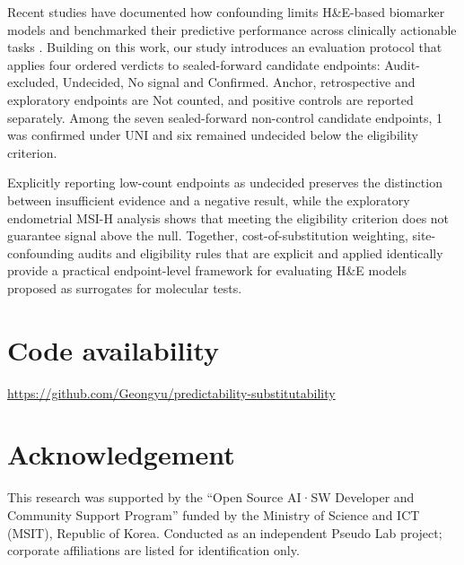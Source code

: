 \documentclass[a4paper,10pt,twocolumn]{extarticle}
\begin{document}
Recent studies have documented how confounding limits H\&E-based biomarker models \cite{dawood2026} and benchmarked their predictive performance across clinically actionable tasks \cite{goldmark2026}. Building on this work, our study introduces an evaluation protocol that applies four ordered verdicts to sealed-forward candidate endpoints: Audit-excluded, Undecided, No signal and Confirmed. Anchor, retrospective and exploratory endpoints are Not counted, and positive controls are reported separately. Among the seven sealed-forward non-control candidate endpoints, 1 was confirmed under UNI and six remained undecided below the eligibility criterion.

Explicitly reporting low-count endpoints as undecided preserves the distinction between insufficient evidence and a negative result, while the exploratory endometrial MSI-H analysis shows that meeting the eligibility criterion does not guarantee signal above the null. Together, cost-of-substitution weighting, site-confounding audits and eligibility rules that are explicit and applied identically provide a practical endpoint-level framework for evaluating H\&E models proposed as surrogates for molecular tests.

\section*{Code availability}
{\raggedright\url{https://github.com/Geongyu/predictability-substitutability}\par}

\section*{Acknowledgement}
This research was supported by the “Open Source AI·SW Developer and Community Support Program” funded by the Ministry of Science and ICT (MSIT), Republic of Korea. Conducted as an independent Pseudo Lab project; corporate affiliations are listed for identification only.
\end{document}
